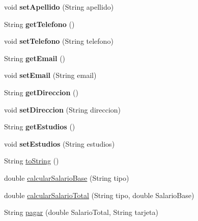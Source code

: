 \begin{DoxyCompactItemize}
\mbox{\label{classprofesores_1_1_profesor_a547dd4c6facd9f4c33f38aa2b2716e9a}} 
void {\bfseries set\+Apellido} (String apellido)
\item 
\mbox{\label{classprofesores_1_1_profesor_aaeb990caa96b2813987d37a52c014e32}} 
String {\bfseries get\+Telefono} ()
\item 
\mbox{\label{classprofesores_1_1_profesor_ab2b194c90ad53020742bf3c32f8cac2d}} 
void {\bfseries set\+Telefono} (String telefono)
\item 
\mbox{\label{classprofesores_1_1_profesor_accad5e71f2b8770733f04580de7d1ce1}} 
String {\bfseries get\+Email} ()
\item 
\mbox{\label{classprofesores_1_1_profesor_ab042fbac761b5f84fdb0570e51c94312}} 
void {\bfseries set\+Email} (String email)
\item 
\mbox{\label{classprofesores_1_1_profesor_a28864dcb1b5f2afcc659f7280971bd90}} 
String {\bfseries get\+Direccion} ()
\item 
\mbox{\label{classprofesores_1_1_profesor_aa8188418700e68d320aa02e6119e26aa}} 
void {\bfseries set\+Direccion} (String direccion)
\item 
\mbox{\label{classprofesores_1_1_profesor_a4aa6ff81cdf93a089d24c4e84241d967}} 
String {\bfseries get\+Estudios} ()
\item 
\mbox{\label{classprofesores_1_1_profesor_a485851296804b08c7616834236f4dee2}} 
void {\bfseries set\+Estudios} (String estudios)
\item 
String \hyperlink{classprofesores_1_1_profesor_ac8119d859ea0285c0d85c3a6ad180ee1}{to\+String} ()
\item 
double \hyperlink{classprofesores_1_1_profesor_a3aec8bbbefe797e12211f3bac7cb859a}{calcular\+Salario\+Base} (String tipo)
\item 
double \hyperlink{classprofesores_1_1_profesor_a327b9cf03989d19961cdd2ecef3f7f0f}{calcular\+Salario\+Total} (String tipo, double Salario\+Base)
\item 
String \hyperlink{classprofesores_1_1_profesor_a301255f4c88fd769cfca0667d743c80f}{pagar} (double Salario\+Total, String tarjeta)
\end{DoxyCompactItemize}


